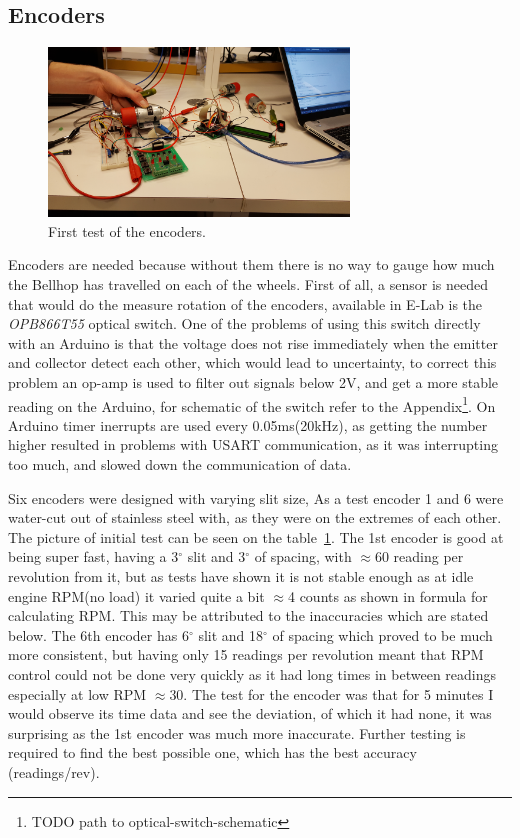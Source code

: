\documentclass[11pt]{article}
\begin{document}
\subsection*{Encoders}

\begin{figure}
  \includegraphics[width=8cm]{encoders.jpg}
  \caption{First test of the encoders.}
  \label{encoder-test}
\end{figure}


Encoders are needed because without them there is no way to gauge how much the Bellhop has travelled on each of the wheels. First of all, a sensor is needed that would do the measure rotation of the encoders, available in E-Lab is the \textit{OPB866T55} optical switch. One of the problems of using this switch directly with an Arduino is that the voltage does not rise immediately when the emitter and collector detect each other, which would lead to uncertainty, to correct this problem an op-amp is used to filter out signals below 2V, and get a more stable reading on the Arduino, for schematic of the switch refer to the Appendix\footnote{TODO path to optical-switch-schematic}. On Arduino timer inerrupts are used every 0.05ms(20kHz), as getting the number higher resulted in problems with USART communication, as it was interrupting too much, and slowed down the communication of data.



Six encoders were designed with varying slit size, As a test encoder 1 and 6 were water-cut out of stainless steel with, as they were on the extremes of each other. The picture of initial test can be seen on the table~\ref{encoder-test}. The 1st encoder is good at being super fast, having a 3$^\circ$ slit and 3$^\circ$ of spacing, with $\approx$60 reading per revolution from it, but as tests have shown it is not stable enough as at idle engine RPM(no load) it varied quite a bit $\approx$4 counts as shown in formula for calculating RPM. This may be attributed to the inaccuracies which are stated below. The 6th encoder has 6$^\circ$ slit and 18$^\circ$ of spacing which proved to be much more consistent, but having only 15 readings per revolution meant that RPM control could not be done very quickly as it had long times in between readings especially at low RPM $\approx$30. The test for the encoder was that for 5 minutes I would observe its time data and see the deviation, of which it had none, it was surprising as the 1st encoder was much more inaccurate. Further testing is required to find the best possible one, which has the best accuracy (readings/rev).
\end{document}
